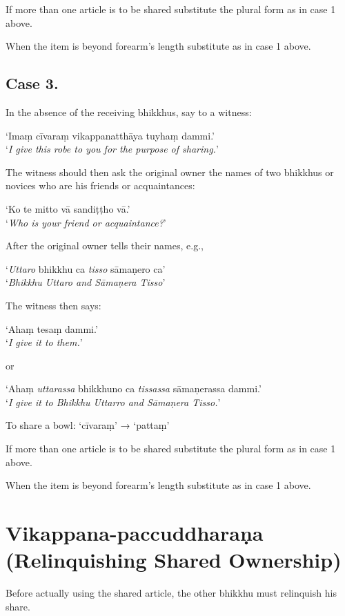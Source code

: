 If more than one article is to be shared substitute the plural form as in case 1 above.

When the item is beyond forearm’s length substitute as in case 1 above.


\subsection{Case 3.}

In the absence of the receiving bhikkhus, say to a witness:

‘Imaṃ cīvaraṃ vikappanatthāya tuyhaṃ dammi.’\\
‘\emph{I give this robe to you for the purpose of sharing.}’

The witness should then ask the original owner the names of two bhikkhus or
novices who are his friends or acquaintances:

‘Ko te mitto vā sandiṭṭho vā.’\\
‘\emph{Who is your friend or acquaintance?}’

After the original owner tells their names, e.g.,

‘\emph{Uttaro} bhikkhu ca \emph{tisso} sāmaṇero ca’\\
‘\emph{Bhikkhu Uttaro and Sāmaṇera Tisso}’

The witness then says:

‘Ahaṃ tesaṃ dammi.’\\
‘\emph{I give it to them.}’

or

‘Ahaṃ \emph{uttarassa} bhikkhuno ca \emph{tissassa} sāmaṇerassa dammi.’\\
‘\emph{I give it to Bhikkhu Uttarro and Sāmaṇera Tisso.}’


To share a bowl: ‘cīvaraṃ’ → ‘pattaṃ’

If more than one article is to be shared substitute the plural form as in case 1
above.

When the item is beyond forearm’s length substitute as in case 1 above.

\section{Vikappana-paccuddharaṇa (Relinquishing Shared Ownership)}

Before actually using the shared article, the other bhikkhu must relinquish his
share.

